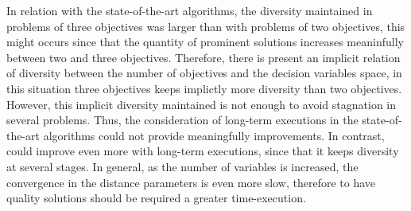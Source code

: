 In relation with the state-of-the-art algorithms, the diversity maintained in problems of three objectives was larger than with problems of two objectives, this might occurs since that the quantity of prominent solutions increases meaninfully between two and three objectives.
%
Therefore, there is present an implicit relation of diversity between the number of objectives and the decision variables space, in this situation three objectives keeps implictly more diversity than two objectives.
%
However, this implicit diversity maintained is not enough to avoid stagnation in several problems.
%
Thus, the consideration of long-term executions in the state-of-the-art algorithms could not provide meaningfully improvements.
%
In contrast, \VSDMOEA{} could improve even more with long-term executions, since that it keeps diversity at several stages.
%
In general, as the number of variables is increased, the convergence in the distance parameters is even more slow, therefore to have quality solutions should be required a greater time-execution.
%

%
%
%
%
%
%
%
%
%
%



